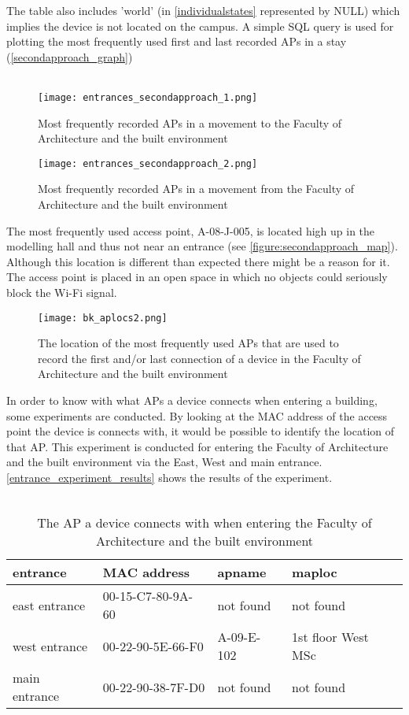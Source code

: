 The table also includes ’world’ (in \autoref{individualstates} represented by NULL) which implies the device is not located on the campus. A simple SQL query is used for plotting the most frequently used first and last recorded APs in a stay (\autoref{secondapproach_graph})\\\\
\begin{figure}[H]
	\centering
	\texttt{[image: entrances\_secondapproach\_1.png]}
	\captionsetup{justification=centering}
	\caption{Most frequently recorded APs in a movement to the Faculty of Architecture and the built environment}
	\label{secondapproach_graph}
\end{figure}
\begin{figure}[H]
	\centering
	\texttt{[image: entrances\_secondapproach\_2.png]}
	\captionsetup{justification=centering}
	\caption{Most frequently recorded APs in a movement from the Faculty of Architecture and the built environment}
	\label{secondapproach_graph}
\end{figure}
The most frequently used access point, A-08-J-005, is located high up in the modelling hall and thus not near an entrance (see \autoref{figure:secondapproach_map}). Although this location is different than expected there might be a reason for it. The access point is placed in an open space in which no objects could seriously block the Wi-Fi signal.
\begin{figure}[H]
	\centering
	\texttt{[image: bk\_aplocs2.png]}
	\captionsetup{justification=centering}
	\caption{The location of the most frequently used APs that are used to record the first and/or last connection of a device in the Faculty of Architecture and the built environment}
	\label{figure:secondapproach_map}
\end{figure}
In order to know with what APs a device connects when entering a building, some experiments are conducted. By looking at the MAC address of the access point the device is connects with, it would be possible to identify the location of that AP. This experiment is conducted for entering the Faculty of Architecture and the built environment via the East, West and main entrance. \autoref{entrance_experiment_results} shows the results of the experiment.\\\\
\begin{table}[H]
	\centering
	\captionsetup{justification=centering}
	\caption{The AP a device connects with when entering the Faculty of Architecture and the built environment}
	\label{entrance_experiment_results}
	\begin{tabular}{@{}llll@{}}
		\toprule
		\textbf{entrance} & \textbf{MAC address} & \textbf{apname} & \textbf{maploc}    \\ \midrule
		east entrance     & 00-15-C7-80-9A-60    & not found       & not found          \\
		west entrance     & 00-22-90-5E-66-F0    & A-09-E-102      & 1st floor West MSc \\
		main entrance     & 00-22-90-38-7F-D0    & not found       & not found          \\ \bottomrule
	\end{tabular}
\end{table}
